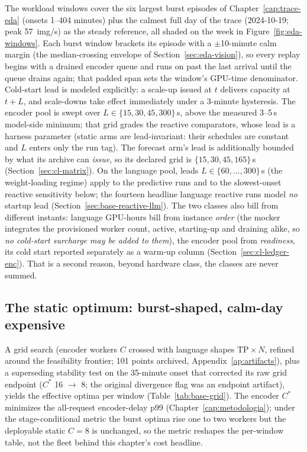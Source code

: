 The workload windows cover the six largest burst episodes of
Chapter~\ref{cap:trace-eda} (onsets 1--404 minutes) plus the calmest full day
of the trace (2024-10-19; peak \SI{57}{img/s}) as the steady reference, all
shaded on the week in Figure~\ref{fig:eda-windows}. Each burst window brackets
its episode with a $\pm$10-minute calm margin (the median-crossing envelope of
Section~\ref{sec:eda-vision}), so every replay begins with a drained encoder
queue and runs on past the last arrival until the queue drains again; that
padded span sets the window's GPU-time denominator. Cold-start lead is modeled
explicitly: a scale-up issued at $t$ delivers capacity at $t+L$, and scale-downs
take effect immediately under a 3-minute hysteresis. The encoder pool is
swept over $L \in \{15,30,45,300\}$\,\si{\second}, above the measured
3--5\,\si{\second} model-side minimum; that grid grades the reactive
comparators, whose lead is a harness parameter (static arms are
lead-invariant: their schedules are constant and $L$ enters only the run
tag). The forecast arm's
lead is additionally bounded by what its archive can \emph{issue}, so its
declared grid is $\{15,30,45,165\}$\,\si{\second}
(Section~\ref{sec:cl-matrix}). On the language pool, leads $L \in
\{60,\ldots,300\}$\,\si{\second} (the weight-loading regime) apply to the
predictive runs and to the slowest-onset reactive sensitivity below; the fourteen
headline language reactive runs model \emph{no} startup lead
(Section~\ref{sec:base-reactive-llm}). The two classes also bill from different
instants: language GPU-hours bill from instance \emph{order} (the mocker
integrates the provisioned worker count, active, starting-up and draining
alike, so \emph{no cold-start surcharge may be added to them}), the encoder
pool from \emph{readiness}, its cold start reported separately as a warm-up
column (Section~\ref{sec:cl-ledger-enc}). That is a second reason, beyond
hardware class, the classes are never summed.

\subsection{The static optimum: burst-shaped, calm-day expensive}
\label{sec:base-static}

A grid search (encoder workers $C$ crossed with language shapes
$\mathrm{TP}\times N$, refined around the feasibility frontier; 101 points
archived, Appendix~\ref{ap:artifacts}), plus a superseding stability
test on the 35-minute onset that corrected its raw grid endpoint ($C^{*}$ 16
$\to$ 8; the original
divergence flag was an endpoint artifact), yields the effective optima per
window (Table~\ref{tab:base-grid}). The encoder $C^{*}$ minimizes the
all-request encoder-delay p99 (Chapter~\ref{cap:metodologia}); under the
stage-conditional metric the burst optima rise one to two workers but the
deployable static $C{=}8$ is unchanged, so the metric reshapes the per-window
table, not the fleet behind this chapter's cost headline.

